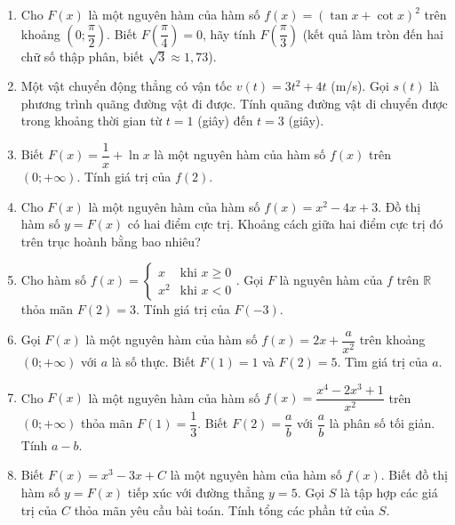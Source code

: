 \documentclass[12pt]{article}
\begin{document}
\begin{enumerate}[label=\textbf{Câu \arabic*.}, start=1]
		
		\item Cho $F(x)$ là một nguyên hàm của hàm số $f(x) = (\tan x + \cot x)^2$ trên khoảng $\left(0; \dfrac{\pi}{2}\right)$. Biết $F\left(\dfrac{\pi}{4}\right) = 0$, hãy tính $F\left(\dfrac{\pi}{3}\right)$ (kết quả làm tròn đến hai chữ số thập phân, biết $\sqrt{3} \approx 1,73$).
		
		
		\item Một vật chuyển động thẳng có vận tốc $v(t) = 3t^2 + 4t$ (m/s). Gọi $s(t)$ là phương trình quãng đường vật đi được. Tính quãng đường vật di chuyển được trong khoảng thời gian từ $t = 1$ (giây) đến $t = 3$ (giây).
		
		
		\item Biết $F(x) = \dfrac{1}{x} + \ln x$ là một nguyên hàm của hàm số $f(x)$ trên $(0; +\infty)$. Tính giá trị của $f(2)$.
		
		
		\item Cho $F(x)$ là một nguyên hàm của hàm số $f(x) = x^2 - 4x + 3$. Đồ thị hàm số $y = F(x)$ có hai điểm cực trị. Khoảng cách giữa hai điểm cực trị đó trên trục hoành bằng bao nhiêu?
		
		
		\item Cho hàm số $f(x) = \begin{cases} x & \text{khi } x \ge 0 \\ x^2 & \text{khi } x < 0 \end{cases}$. Gọi $F$ là nguyên hàm của $f$ trên $\mathbb{R}$ thỏa mãn $F(2) = 3$. Tính giá trị của $F(-3)$.
		
		
		\item Gọi $F(x)$ là một nguyên hàm của hàm số $f(x) = 2x + \dfrac{a}{x^2}$ trên khoảng $(0; +\infty)$ với $a$ là số thực. Biết $F(1) = 1$ và $F(2) = 5$. Tìm giá trị của $a$.
		
		
		\item Cho $F(x)$ là một nguyên hàm của hàm số $f(x) = \dfrac{x^4 - 2x^3 + 1}{x^2}$ trên $(0; +\infty)$ thỏa mãn $F(1) = \dfrac{1}{3}$. Biết $F(2) = \dfrac{a}{b}$ với $\dfrac{a}{b}$ là phân số tối giản. Tính $a - b$.
		
		
		\item Biết $F(x) = x^3 - 3x + C$ là một nguyên hàm của hàm số $f(x)$. Biết đồ thị hàm số $y = F(x)$ tiếp xúc với đường thẳng $y = 5$. Gọi $S$ là tập hợp các giá trị của $C$ thỏa mãn yêu cầu bài toán. Tính tổng các phần tử của $S$.
		

\end{enumerate}
\end{document}
